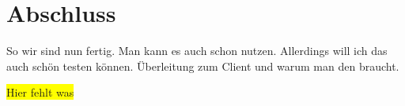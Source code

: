\section{Abschluss}
So wir sind nun fertig. Man kann es auch schon nutzen. Allerdings will ich das auch schön testen können.
Überleitung zum Client und warum man den braucht.

\colorbox{yellow}{Hier fehlt was}